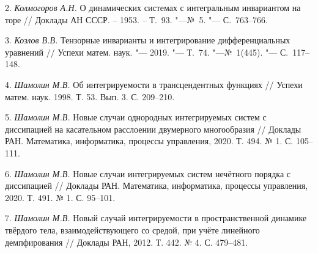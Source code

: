 2. {\it Колмогоров А.Н.} О динамических системах с интегральным инвариантом на торе
// Доклады АН СССР. -- 1953. -- Т.~93. "---№~5. "--- С.~763--766.

3. {\it Козлов В.В.} Тензорные инварианты и интегрирование дифференциальных
уравнений // Успехи матем. наук. "--- 2019. "--- Т.~74. "---№~1(445). "--- С.~117--148.

4. {\it Шамолин М.В.} Об интегрируемости в трансцендентных функциях // Успехи матем. наук. 1998. Т. 53. Вып. 3. С. 209–210.

5. {\it Шамолин М.В.} Новые случаи однородных интегрируемых систем с диссипацией на касательном расслоении двумерного многообразия // Доклады РАН. Математика, информатика, процессы управления, 2020. Т. 494. № 1. С. 105–111.

6. {\it Шамолин М.В.} Новые случаи интегрируемых систем нечётного порядка с диссипацией // Доклады РАН. Математика, информатика, процессы управления, 2020. Т. 491. № 1. С. 95–101.

7. {\it Шамолин М.В.} Новый случай интегрируемости в пространственной динамике твёрдого тела, взаимодействующего со средой, при учёте линейного демпфирования // Доклады РАН, 2012. Т. 442. № 4. С. 479–481.


